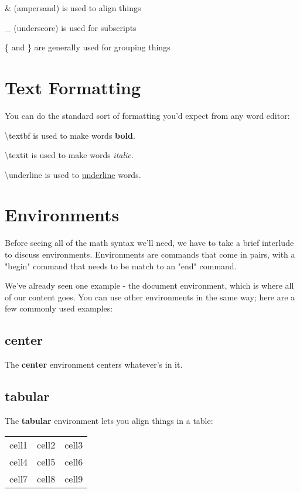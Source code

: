 \documentclass{article}
\begin{document}
    \& (ampersand) is used to align things

    \_ (underscore) is used for subscripts

    \{ and \} are generally used for grouping things


\section{Text Formatting}
    You can do the standard sort of formatting you'd expect from any word editor:

    \textbackslash textbf{} is used to make words \textbf{bold}.

    \textbackslash textit{} is used to make words \textit{italic}.

    \textbackslash underline{} is used to \underline{underline} words.


\section{Environments}
    Before seeing all of the math syntax we'll need, we have to take a brief interlude to discuss environments. Environments are commands that come in pairs, with a "begin" command that needs to be match to an "end" command.

    We've already seen one example - the document environment, which is where all of our content goes. You can use other environments in the same way; here are a few commonly used examples:

    \subsection{center}
        \begin{center}
            The \textbf{center} environment centers whatever's in it.
        \end{center}

        \subsection{tabular}
        The \textbf{tabular} environment lets you align things in a table:
        \begin{tabular}{ c c c }
          cell1 & cell2 & cell3 \\
          cell4 & cell5 & cell6 \\
          cell7 & cell8 & cell9 \\
        \end{tabular}
\end{document}
